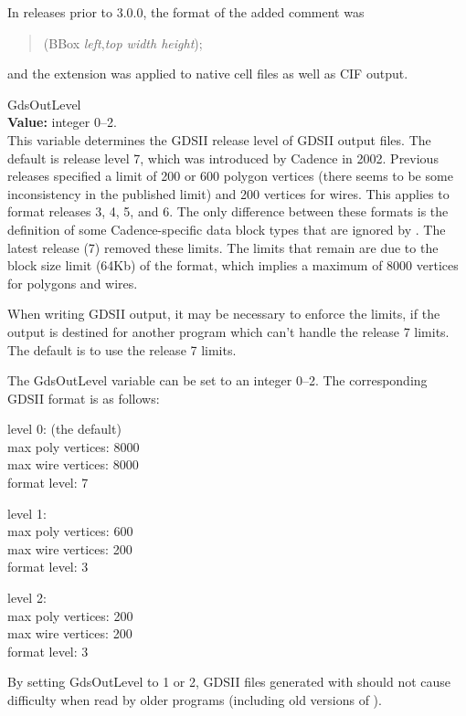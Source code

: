 \begin{description}
In {\Xic} releases prior to 3.0.0, the format of the added
comment was 
\begin{quote}
(BBox {\it left\/},{\it top width height}{\vt );}
\end{quote}
and the extension was applied to native cell files as well as CIF
output.

\item{\et GdsOutLevel}\\
{\bf Value:} integer 0--2.\\
This variable determines the GDSII release level of GDSII output
files.  The default is release level 7, which was introduced by
Cadence in 2002.  Previous releases specified a limit of 200 or 600
polygon vertices (there seems to be some inconsistency in the
published limit) and 200 vertices for wires.  This applies to format
releases 3, 4, 5, and 6.  The only difference between these formats is
the definition of some Cadence-specific data block types that are
ignored by {\Xic}.  The latest release (7) removed these limits. 
The limits that remain are due to the block size limit (64Kb) of the
format, which implies a maximum of 8000 vertices for polygons and
wires.

When writing GDSII output, it may be necessary to enforce the limits,
if the output is destined for another program which can't handle the
release 7 limits.  The {\Xic} default is to use the release 7 limits.

The {\et GdsOutLevel} variable can be set to an integer 0--2.  The
corresponding GDSII format is as follows:
\begin{description}
\item{level 0: (the default)}\\
max poly vertices: 8000\\
max wire vertices: 8000\\
format level: 7
\item{level 1:}\\
max poly vertices: 600\\
max wire vertices: 200\\
format level: 3
\item{level 2:}\\
max poly vertices: 200\\
max wire vertices: 200\\
format level: 3
\end{description}

By setting {\et GdsOutLevel} to 1 or 2, GDSII files generated with
{\Xic} should not cause difficulty when read by older programs
(including old versions of {\Xic}).


\end{description}

